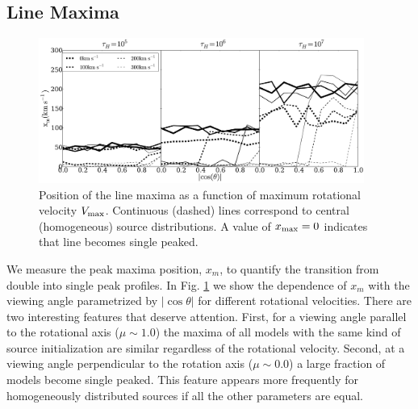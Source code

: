 \subsection{Line Maxima}
\label{sec:maxima}
\begin{figure}
\begin{center}
\includegraphics[width=0.95\textwidth]{Figures/f8.pdf}
\end{center}
\caption{Position of the line maxima as a function of maximum
rotational velocity $V_{\rm max}$. Continuous (dashed) lines
correspond to central (homogeneous) source distributions. A value
of $x_{\rm max}=0$ indicates that line becomes single
peaked. \label{fig:maximumvsvelocity}}
\end{figure}
We measure the peak maxima position, $x_m$, to quantify the transition from
double into single peak profiles.
In Fig. \ref{fig:maximumvsvelocity} we show the dependence of $x_m$ with
the viewing angle parametrized by $|\cos\theta|$ for different
rotational velocities.
There are two interesting features that deserve attention.
First, for a viewing angle parallel to the rotational axis ($\mu\sim
1.0$) the maxima of all models with the same kind of source
initialization are similar regardless of the rotational velocity.
Second, at a viewing angle perpendicular to the rotation axis ($\mu\sim 0.0$) a
large fraction of models become single peaked.
This feature appears more frequently for homogeneously distributed
sources if all the other parameters are equal.
